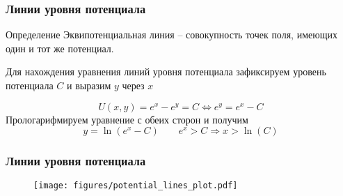 \begin{frame}\frametitle{Линии уровня потенциала}
  \begin{block}{Определение}
    Эквипотенциальная линия -- совокупность точек поля, имеющих один и тот же
    потенциал.
  \end{block}

  Для нахождения уравнения линий уровня потенциала зафиксируем
  уровень потенциала \(C\) и выразим \(y\) через \(x\)

  \begin{equation}
    U(x, y) = e^x - e^y = C \Longleftrightarrow e^y = e^x - C
    \label{eq:potential_level_line}
  \end{equation}
  Прологарифмируем уравнение с обеих сторон и получим
  \begin{equation}
    y = \ln(e^x - C) \qquad e^x > C \Rightarrow x > \ln(C)
  \end{equation}
  
\end{frame}

\begin{frame}\frametitle{Линии уровня потенциала}
  \begin{figure}
    \centering
		\texttt{[image: figures/potential\_lines\_plot.pdf]}
  \end{figure}
  
\end{frame}
